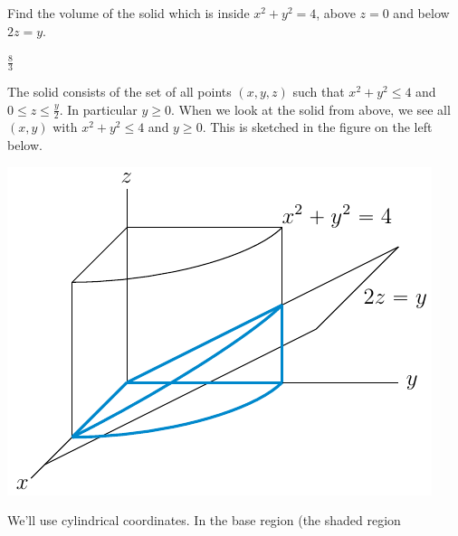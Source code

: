 \begin{question} [M200 2000A] %
Find the volume of the solid which is inside $x^2 + y^2 = 4$,
above $z = 0$ and below $2z = y$.
\end{question}

%

\begin{answer}
$\frac{8}{3}$
\end{answer}

\begin{solution}
The solid consists of the set of all points $(x,y,z)$ such
that $x^2+y^2\le 4$ and $0\le z\le\frac{y}{2}$. In particular $y\ge 0$.
When we look at the solid from above, we see all $(x,y)$ with
$x^2+y^2\le 4$ and $y\ge 0$. This is sketched in the figure on the left
below.
\begin{center}
     \qquad
     \includegraphics{fig/OE00AQ9b.pdf}
\end{center}   
We'll use cylindrical coordinates. In the base region (the shaded region

\end{solution}
